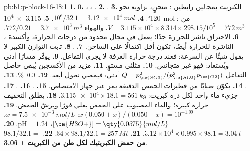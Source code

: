 \begin{solution}{pb:b1:p-block-16-18:1}
\textbf{1.} 0، ، ، .
\textbf{2.} .
\textbf{3.} الكبريت بمجالين رابطين : منحنٍ، بزاوية نحو
\ang{120}.
\textbf{4.} $10^6/32.1 = \qty{3.12e4}{mol}$.
\textbf{5.} \qty{3.115e4}{mol} من : $V = 3.115 \times 10^4 \times
8.314 \times 298.15/10^5 = \qty{772}{m^3}$، والهواء $772/0.21 = \qty{3.7e3}{m^3}$.
\textbf{6.} الاحتراق ناشر للحرارة جدًا؛  يعمل في مجال
محدود من درجات الحرارة، وأكسدة ، الناشرة للحرارة أيضًا، تكون أقل
اكتمالًا على الساخن.
\textbf{7.} .
\textbf{8.} ثابت التوازن الكبير لا يقول شيئًا عن السرعة: فعند
درجة حرارة الغرفة لا يجري التفاعل.
\textbf{9.} يوفّر مسارًا  أدنى ويُستعاد:
فهو  غير متجانس.
\textbf{10.} مثلثي مستوٍ.
\textbf{11.} مزيد من الأكسجين يُبقي حاصل التفاعل
$Q = p_{\ce{SO3}}^2/(p_{\ce{SO2}}^2 p_{\ce{O2}})$ أدنى: فيمضي تحول
 أبعد.
\textbf{12.} \qty{0.3}{\percent}.
\textbf{13.} .
\textbf{14.} يكوّن ضبابًا من قطيرات الحمض الدقيقة يمر عبر
جهاز الامتصاص.
\textbf{15.} .
\textbf{16.} .
\textbf{17.} جزيء ماء واحد لكل ذرة كبريت: $\num{3.115e4} \times 18.0 =
\qty{561}{kg}$.
\textbf{18.} يطلق التخفيف حرارة كبيرة؛ والماء المصبوب على الحمض
يغلي فورًا ويرشّ الحمض.
\textbf{19.} $x(0.050 + x)/(0.050 - x) = 10^{-1.99}$: $x = \qty{7.5e-3}{mol/L}$،
$[\ce{H3O+}] = \qty{0.0575}{mol/L}$، $\mathrm{pH} = 1.24$.
\textbf{20.} $3.12 \times 10^4 \times 0.995 \times 98.1 = \qty{3.04}{t}$.
\textbf{21.} $84 \times 98.1/32.1 = \qty{257}{Mt}$.
\textbf{22.} $98.1/32.1 =$ \textbf{\qty{3.06}{t} من حمض الكبريتيك لكل طن من
الكبريت}.
\end{solution}
